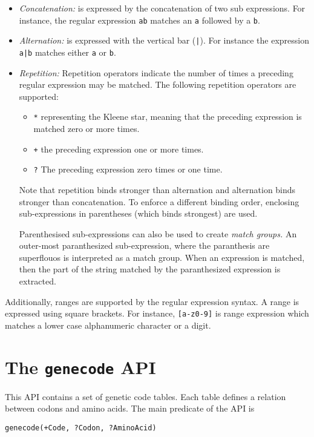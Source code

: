 \documentclass{book}
\begin{document}
\begin{itemize}
\item \emph{Concatenation:} is expressed by the concatenation of two
  sub expressions. For instance, the regular expression  \texttt{ab}
  matches an \texttt{a} followed by a \texttt{b}.
\item \emph{Alternation:} is expressed with the vertical bar (\texttt{|}). For
  instance the expression \texttt{a|b} matches either \texttt{a} or \texttt{b}.
\item \emph{Repetition:} Repetition operators indicate the number of
  times a preceding regular expression may be matched. The following 
repetition operators are supported:
\begin{itemize}
\item \texttt{*} representing the Kleene star, meaning that the
  preceding expression is matched zero or more times.
\item \texttt{+} the preceding expression one or more times.
\item \texttt{?} The preceding expression zero times or one time.
\end{itemize}

Note that repetition binds stronger than alternation and alternation
binds stronger than concatenation. To enforce a different binding
order, enclosing sub-expressions in parentheses (which binds strongest)
are used.

Parenthesised sub-expressions can also be used to create \emph{match
  groups.} 
An outer-most paranthesized sub-expression,
  where the paranthesis are superflouos is interpreted as a match
  group. When an expression is matched, then the part of the string matched by the
  paranthesized expression is extracted. 
\end{itemize}

Additionally, ranges are supported by the regular expression syntax.
A range is expressed using square brackets. For instance,
\texttt{[a-z0-9]} is range expression which matches a lower case
alphanumeric character or a digit. 

\section{The \texttt{genecode} API}
\label{sec:genecode}

This API contains a set of genetic code tables. Each table defines
a relation between codons and amino acids. The main predicate of the API
is 
\begin{verbatim}
genecode(+Code, ?Codon, ?AminoAcid)
\end{verbatim}
\end{document}
